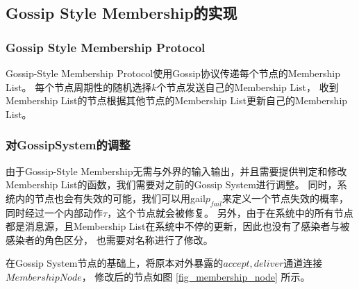 \subsection{Gossip Style Membership的实现}

\subsubsection{Gossip Style Membership Protocol}
Gossip-Style Membership Protocol使用Gossip协议传递每个节点的Membership List。
每个节点周期性的随机选择$k$个节点发送自己的Membership List，
收到Membership List的节点根据其他节点的Membership List更新自己的Membership List。

\subsubsection{对GossipSystem的调整}
由于Gossip-Style Membership无需与外界的输入输出，并且需要提供判定和修改Membership List的函数，我们需要对之前的Gossip System进行调整。
同时，系统内的节点也会有失效的可能，我们可以用gail$p_{fail}$来定义一个节点失效的概率，同时经过一个内部动作$\tau$，这个节点就会被修复。
另外，由于在系统中的所有节点都是消息源，且Membership List在系统中不停的更新，因此也没有了感染者与被感染者的角色区分，
也需要对名称进行了修改。

在Gossip System节点的基础上，将原本对外暴露的$accept,deliver$通道连接$Membership Node$，
修改后的节点如图
\ref{fig_membership_node}
所示。

